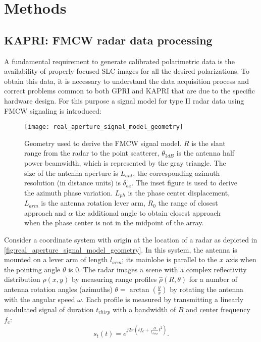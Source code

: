 \section{Methods}\label{sec:methods}
\subsection{KAPRI: FMCW radar data processing}\label{sec:proc_SLC}
A fundamental requirement to generate calibrated polarimetric data is the availability of properly focused SLC images for all the desired polarizations. To obtain this data, it is necessary to understand the data acquisition process and correct problems common to both GPRI and KAPRI that are due to the specific hardware design.  
For this purpose a signal model for type II\cite{Caduff2015} radar data using FMCW signaling\cite{Stove1992} is introduced:\\
\begin{figure}[h]
	\centering
	\texttt{[image: real\_aperture\_signal\_model\_geometry]}
	\caption{Geometry used to derive the FMCW signal model. $R$ is the slant range from the radar to the point scatterer, $\theta_{3dB}$ is the antenna half power beamwidth, which is represented by the gray triangle. The size of the antenna aperture is $L_{ant}$, the corresponding azimuth resolution (in distance units) is $\delta_{az}$. The inset figure is used to derive the azimuth phase variation. $L_{ph}$ is the phase center displacement, $L_{arm}$ is the antenna rotation lever arm, $R_{0}$ the range of closest approach and $\alpha$ the additional angle to obtain closest approach when the phase center is not in the midpoint of the array.}
	\label{fig:real_aperture_signal_model_geometry}
\end{figure}
Consider a coordinate system with origin at the location of a radar as depicted in \autoref{fig:real_aperture_signal_model_geometry}. In this system, the antenna is mounted on a lever arm of length $l_{arm}$; its mainlobe is parallel to the $x$ axis when the pointing angle $\theta$ is 0. The radar images a scene with a complex reflectivity distribution $\rho\left(x,y\right)$ by measuring range profiles $\hat{\rho}\left(R, \theta\right)$ for a number of antenna rotation angles (azimuths) $\theta = \operatorname{arctan}\left(\frac{y}{x}\right)$ by rotating the antenna with the angular speed $\omega$. Each profile is measured by transmitting a linearly modulated signal of duration $t_{chirp}$ with a bandwidth of $B$ and center frequency $f_c$:\\
\begin{equation}
	s_t\left(t\right) = e^{j 2 \pi \left( t f_{c} +  \frac{B}{t_{chirp}} t^2 \right)}.
\end{equation}
